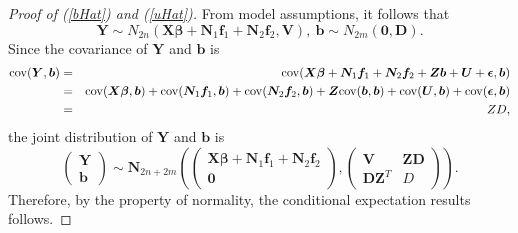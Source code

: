 \documentclass[review]{elsarticle}
\begin{document}
\begin{proof} [Proof of (\ref{bHat}) and  (\ref{uHat})]
From model assumptions, it follows that 
$$
\boldsymbol Y \sim
N_{2n} \left(\bm{X}\bm{\beta} + \bm N_{1} \bm f_1 + \bm N_{2} \bm f_2,  \bm V \right), \ 
\bm b \sim N_{2m} (\bm 0, \bm D).
$$
Since the covariance of $\bm Y$ and $\bm b$ is
\begin{eqnarray*}
{\rm cov} (\boldsymbol Y, \boldsymbol b) &=& {\rm cov}(\boldsymbol{X}\boldsymbol{\beta} +
\boldsymbol N_1 \boldsymbol f_1 + 
\boldsymbol N_2 \boldsymbol f_2 + 
\boldsymbol{Z}\boldsymbol{b} + 
\boldsymbol U + 
\boldsymbol \epsilon, \boldsymbol b) \\ 
&=& {\rm cov}(\boldsymbol{X}\boldsymbol{\beta}, \boldsymbol b)  +
{\rm cov}( \boldsymbol N_1 \boldsymbol f_1,  \boldsymbol b)+ 
{\rm cov}(\boldsymbol N_2 \boldsymbol f_2, \boldsymbol b) 
+ 
\boldsymbol{Z}{\rm cov}(\boldsymbol{b}, \boldsymbol b) + 
{\rm cov}(\boldsymbol U, \boldsymbol b) + 
{\rm cov}(\boldsymbol \epsilon, \boldsymbol b) \\
&=& ZD,
\end{eqnarray*}
the joint distribution of $\bm Y$ and $\bm b$ is
 \[
 \begin{pmatrix}
  \boldsymbol Y \\
  \boldsymbol b
 \end{pmatrix}
 \sim 
 \boldsymbol N_{2n + 2m} 
 \left(
 \begin{pmatrix}
 \boldsymbol{X}\boldsymbol{\beta} + \boldsymbol N_{1} \boldsymbol f_1 +  \boldsymbol N_{2} \boldsymbol f_2 \\
\boldsymbol 0
 \end{pmatrix},
  \begin{pmatrix}
  \boldsymbol V &  \boldsymbol Z\boldsymbol D \\
  \boldsymbol D\boldsymbol Z^T & D 
 \end{pmatrix}
 \right).
\]
Therefore, by the property of normality, the conditional expectation results follows.
\end{proof}
\end{document}
